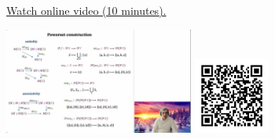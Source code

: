 
\begin{minipage}{10cm}
    \href{https://act4e-spring21.netlify.app/videos/spring2021-monads-a:monad-powerset.html}{Watch online video (10 minutes).}
        
    \href{https://act4e-spring21.netlify.app/videos/spring2021-monads-a:monad-powerset.html}{\includegraphics[height=3.5cm]{spring2021-monads-a:monad-powerset/thumbnails.jpg}}
    \href{https://act4e-spring21.netlify.app/videos/spring2021-monads-a:monad-powerset.html}{\includegraphics[height=2.5cm]{spring2021-monads-a:monad-powerset/qrcode.png}}
\end{minipage}
